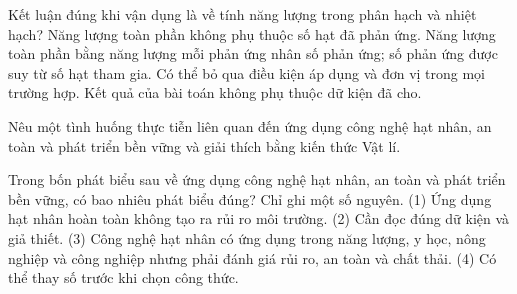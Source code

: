 \begin{ex}
Kết luận đúng khi vận dụng là về tính năng lượng trong phân hạch và nhiệt hạch?
\choice
{Năng lượng toàn phần không phụ thuộc số hạt đã phản ứng.}
{\True Năng lượng toàn phần bằng năng lượng mỗi phản ứng nhân số phản ứng; số phản ứng được suy từ số hạt tham gia.}
{Có thể bỏ qua điều kiện áp dụng và đơn vị trong mọi trường hợp.}
{Kết quả của bài toán không phụ thuộc dữ kiện đã cho.}
\end{ex}

\begin{bt}
Nêu một tình huống thực tiễn liên quan đến ứng dụng công nghệ hạt nhân, an toàn và phát triển bền vững và giải thích bằng kiến thức Vật lí.
\end{bt}

\begin{ex}
Trong bốn phát biểu sau về ứng dụng công nghệ hạt nhân, an toàn và phát triển bền vững, có bao nhiêu phát biểu đúng? Chỉ ghi một số nguyên. (1) Ứng dụng hạt nhân hoàn toàn không tạo ra rủi ro môi trường. (2) Cần đọc đúng dữ kiện và giả thiết. (3) Công nghệ hạt nhân có ứng dụng trong năng lượng, y học, nông nghiệp và công nghiệp nhưng phải đánh giá rủi ro, an toàn và chất thải. (4) Có thể thay số trước khi chọn công thức.
\end{ex}

